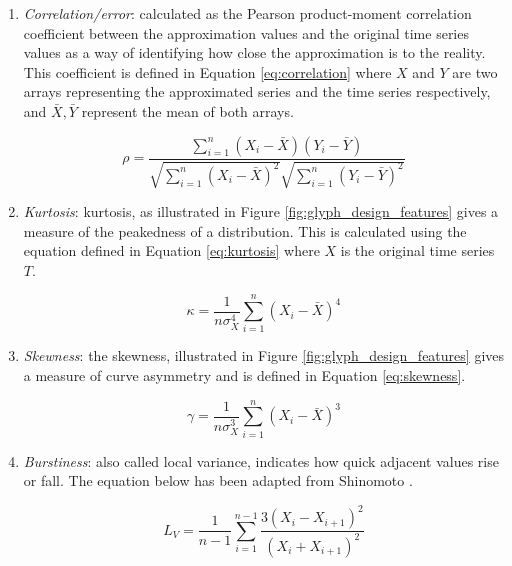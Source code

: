 \begin{enumerate}
\item \emph{Correlation/error}: calculated as the Pearson product-moment correlation coefficient between the approximation values and the original time series values as a way of identifying how close the approximation is to the reality. This coefficient is defined in Equation \ref{eq:correlation} where $X$ and $Y$ are two arrays representing the approximated series and the time series respectively, and $\bar{X},\bar{Y}$ represent the mean of both arrays.

\begin{equation}
\label{eq:correlation}
	\rho = \frac{\sum_{i=1}^n (X_i - \bar{X})(Y_i - \bar{Y})}{\sqrt{\sum_{i=1}^n (X_i - \bar{X})^2}\sqrt{\sum_{i=1}^n (Y_i - \bar{Y})^2}}
\end{equation}

\item \emph{Kurtosis}: kurtosis, as illustrated in Figure \ref{fig:glyph_design_features} gives a measure of the peakedness of a distribution.
This is calculated using the equation defined in Equation \ref{eq:kurtosis} where $X$ is the original time series $T$.


\begin{equation}
\label{eq:kurtosis}
	\kappa = \frac{1}{n\sigma_{X}^4} \sum_{i=1}^n (X_i - \bar{X})^4
\end{equation}


\item \emph{Skewness}: the skewness, illustrated in Figure \ref{fig:glyph_design_features} gives a measure of curve asymmetry and is defined in Equation \ref{eq:skewness}.

\begin{equation}
\label{eq:skewness}
	\gamma = \frac{1}{n\sigma_{X}^3} \sum_{i=1}^n (X_i - \bar{X})^3
\end{equation}

\item \emph{Burstiness}: also called local variance, indicates how quick adjacent values rise or fall. The equation below has been adapted from Shinomoto \etal \cite{shinomoto2003differences}. 

\begin{equation}
\label{eq:local_variance}
L_V= \frac{1}{n-1}  \sum_{i=1}^{n-1} \frac{3(X_i - X_{i+1})^2}{(X_i + X_{i+1})^2}
\end{equation}

\end{enumerate}

